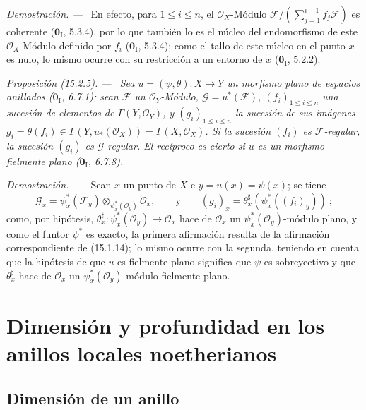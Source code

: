 \documentclass[10pt,oneside]{book}
\makeatletter
\newcommand{\setmanualcurrentlabel}[1]{\def\@currentlabel{#1}}
\newcommand{\oldpage}[2][]{%
  \setcounter{footnote}{0}%
  \marginpar{\scriptsize\textbf{#1}~|~#2}\ignorespaces}
\newenvironment{proposition}[1][]{%
  \setmanualcurrentlabel{#1}\par\medskip\noindent\itshape Proposición (#1). ---\ }{\par}
\newenvironment{proof}{%
  \par\medskip\noindent\textit{Demostración. ---\ }}{\par}
\makeatother
\begin{document}
\begin{proof}
En efecto, para $1\leq i\leq n$, el $\mathcal{O}_X$-Módulo
$\mathscr{F}/(\sum_{j=1}^{i-1}f_j\mathscr{F})$ es coherente
($\mathbf{0}_{\mathrm I}$, 5.3.4), por lo que también lo es el núcleo del endomorfismo
de este $\mathcal{O}_X$-Módulo definido por $f_i$
($\mathbf{0}_{\mathrm I}$, 5.3.4); como el tallo de este núcleo en el punto $x$ es
nulo, lo mismo ocurre con su restricción a un entorno de $x$
($\mathbf{0}_{\mathrm I}$, 5.2.2).
\end{proof}

\begin{proposition}[15.2.5]
\label{0.15.2.5-es}
\oldpage[0\textsubscript{IV-1}]{22}
Sea $u=(\psi,\theta):X\to Y$ un morfismo plano de espacios anillados
\textup{($\mathbf 0_{\mathrm I}$, 6.7.1)}; sean $\mathscr{F}$ un
$\mathcal{O}_Y$-Módulo, $\mathscr{G}=u^*(\mathscr{F})$,
$(f_i)_{1\leq i\leq n}$ una sucesión de elementos de
$\Gamma(Y,\mathcal{O}_Y)$, y $(g_i)_{1\leq i\leq n}$ la sucesión de sus
imágenes
$g_i=\theta(f_i)\in\Gamma(Y,u_*(\mathcal{O}_X))=\Gamma(X,\mathcal{O}_X)$. Si
la sucesión $(f_i)$ es $\mathscr{F}$-regular, la sucesión $(g_i)$ es
$\mathscr{G}$-regular. El recíproco es cierto si $u$ es un morfismo fielmente
plano \textup{($\mathbf 0_{\mathrm I}$, 6.7.8)}.
\end{proposition}

\begin{proof}
Sean $x$ un punto de $X$ e $y=u(x)=\psi(x)$; se tiene
\[
  \mathscr{G}_x=\psi_x^*(\mathscr{F}_y)
  \otimes_{\psi_x^*(\mathcal{O}_y)}\mathcal{O}_x,
  \qquad\text{y}\qquad
  (g_i)_x=\theta_x^\sharp(\psi_x^*((f_i)_y))~;
\]
como, por hipótesis,
$\theta_x^\sharp:\psi_x^*(\mathcal{O}_y)\to\mathcal{O}_x$ hace de
$\mathcal{O}_x$ un $\psi_x^*(\mathcal{O}_y)$-módulo plano, y como el funtor
$\psi^*$ es exacto, la primera afirmación resulta de la afirmación
correspondiente de (15.1.14); lo mismo ocurre con la segunda, teniendo en cuenta
que la hipótesis de que $u$ es fielmente plano significa que $\psi$ es
sobreyectivo y que $\theta_x^\sharp$ hace de $\mathcal{O}_x$ un
$\psi_x^*(\mathcal{O}_y)$-módulo fielmente plano.
\end{proof}

\section{Dimensión y profundidad en los anillos locales noetherianos}
\label{section:0.16-es}

\subsection{Dimensión de un anillo}
\label{subsection:0.16.1-es}
\end{document}
